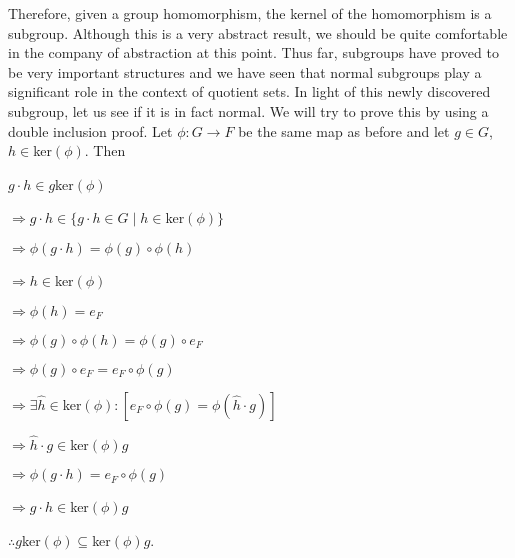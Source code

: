 \documentclass[12pt, a4paper]{article}
\begin{document}
    Therefore, given a group homomorphism, the kernel of the homomorphism is a subgroup. Although this is a very abstract result, we should be quite comfortable in the company of abstraction at this point. Thus far, subgroups have proved to be very important structures and we have seen that normal subgroups play a significant role in the context of quotient sets. In light of this newly discovered subgroup, let us see if it is in fact normal. We will try to prove this by using a double inclusion proof. Let $\phi\colon G\rightarrow F$ be the same map as before and let $g\in G$, $h\in$ker$(\phi)$. Then
    
\vspace{4mm}

\hspace{2mm} $g\cdot h\in g$ker$(\phi)$\par
\vspace{2mm}
\hspace{10mm} $\Rightarrow g\cdot h\in\{g\cdot h\in G\mid h\in$ker$(\phi)\}$\par
\vspace{2mm}
\hspace{10mm} $\Rightarrow\phi(g\cdot h)=\phi(g)\circ\phi(h)$\par
\vspace{2mm}
\hspace{10mm} $\Rightarrow h\in$ker$(\phi)$\par
\vspace{2mm}
\hspace{10mm} $\Rightarrow\phi(h)=e_F$\par
\vspace{2mm}
\hspace{10mm} $\Rightarrow\phi(g)\circ\phi(h)=\phi(g)\circ e_F$\par
\vspace{2mm}
\hspace{10mm} $\Rightarrow\phi(g)\circ e_F=e_F\circ\phi(g)$\par
\vspace{2mm} 
\hspace{10mm} $\Rightarrow\exists\hat{h}\in$ker$(\phi)\colon[e_F\circ\phi(g)=\phi(\hat{h}\cdot g)]$\par
\vspace{2mm}
\hspace{10mm} $\Rightarrow\hat{h}\cdot g\in$ker$(\phi)g$\par
\vspace{2mm}
\hspace{10mm} $\Rightarrow\phi(g\cdot h)=e_F\circ\phi(g)$\par
\vspace{2mm}
\hspace{10mm} $\Rightarrow g\cdot h\in$ker$(\phi)g$\par
\vspace{2mm}
\hspace{2mm} $\therefore g$ker$(\phi)\subseteq$ker$(\phi)g$.
\end{document}
